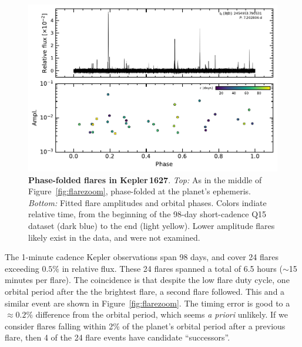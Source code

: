 \documentclass[12pt,modern,tighten]{aastex63}
\begin{document}
\begin{figure}[t]
	\begin{center}
		\leavevmode
		\includegraphics[width=1.0\textwidth]{f8.pdf}
	\end{center}
	\vspace{-0.7cm}
	\caption{
		{\bf Phase-folded flares in Kepler\,1627}.  
    {\it Top:}
    As in the middle of Figure~\ref{fig:flarezoom}, phase-folded at
    the planet's ephemeris.
    {\it Bottom:}
    Fitted flare amplitudes and orbital phases.
    Colors indiate relative time, from the beginning of the
    98-day short-cadence Q15 dataset (dark blue) to the end (light
    yellow).
    Lower amplitude flares likely exist in the data, and were not
    examined.
		\label{fig:flarephase}
	}
\end{figure}


The 1-minute cadence Kepler observations span 98 days, and cover 24
flares exceeding $0.5\%$ in relative flux.  These 24 flares spanned a
total of 6.5 hours ($\sim$15 minutes per flare).  The coincidence is
that despite the low flare duty cycle, one orbital period after the
the brightest flare, a second flare followed.  This and a similar
event are shown in Figure~\ref{fig:flarezoom}.  The timing error is
good to a $\approx0.2\%$ difference from the orbital period, which
seems {\it a priori} unlikely.  If we consider flares falling within
2\% of the planet's orbital period after a previous flare, then 4 of
the 24 flare events have candidate ``successors''.
\end{document}
